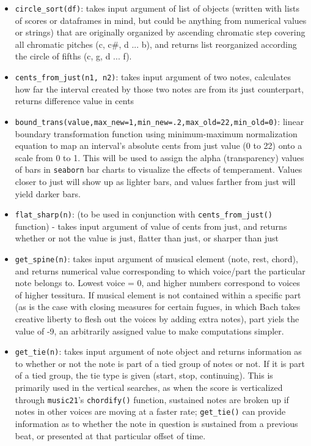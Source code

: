 \begin{itemize}
\tightlist
\item
  \texttt{circle\_sort(df)}: takes input argument of list of objects
  (written with lists of scores or dataframes in mind, but could be
  anything from numerical values or strings) that are originally
  organized by ascending chromatic step covering all chromatic pitches
  (c, c\#, d ... b), and returns list reorganized according the circle
  of fifths (c, g, d ... f).
\item
  \texttt{cents\_from\_just(n1,\ n2)}: takes input argument of two
  notes, calculates how far the interval created by those two notes are
  from its just counterpart, returns difference value in cents
\item
  \texttt{bound\_trans(value,max\_new=1,min\_new=.2,max\_old=22,min\_old=0)}:
  linear boundary transformation function using minimum-maximum
  normalization equation to map an interval's absolute cents from just
  value (0 to 22) onto a scale from 0 to 1. This will be used to assign
  the alpha (transparency) values of bars in \texttt{seaborn} bar charts
  to visualize the effects of temperament. Values closer to just will
  show up as lighter bars, and values farther from just will yield
  darker bars.
\item
  \texttt{flat\_sharp(n)}: (to be used in conjunction with
  \texttt{cents\_from\_just()} function) - takes input argument of value
  of cents from just, and returns whether or not the value is just,
  flatter than just, or sharper than just
\item
  \texttt{get\_spine(n)}: takes input argument of musical element (note,
  rest, chord), and returns numerical value corresponding to which
  voice/part the particular note belongs to. Lowest voice = 0, and
  higher numbers correspond to voices of higher tessitura. If musical
  element is not contained within a specific part (as is the case with
  closing measures for certain fugues, in which Bach takes creative
  liberty to flesh out the voices by adding extra notes), part yiels the
  value of -9, an arbitrarily assigned value to make computations
  simpler.
\item
  \texttt{get\_tie(n)}: takes input argument of note object and returns
  information as to whether or not the note is part of a tied group of
  notes or not. If it is part of a tied group, the tie type is given
  (start, stop, continuing). This is primarily used in the vertical
  searches, as when the score is verticalized through \texttt{music21}'s
  \texttt{chordify()} function, sustained notes are broken up if notes
  in other voices are moving at a faster rate; \texttt{get\_tie()} can
  provide information as to whether the note in question is sustained
  from a previous beat, or presented at that particular offset of time.
\end{itemize}

